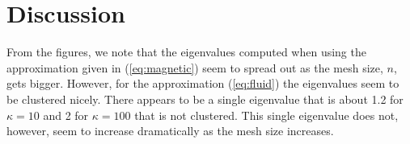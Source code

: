 \documentclass{article}
\begin{document}
\section{Discussion}

From the figures, we note that the eigenvalues computed when using the
approximation given in (\ref{eq:magnetic}) seem to spread out as the mesh size,
$n$, gets bigger. However, for the approximation (\ref{eq:fluid}) the eigenvalues seem to be
clustered nicely. There appears to be a single eigenvalue that is about 1.2 for
$\kappa = 10$ and 2 for $\kappa = 100$ that is not clustered. This single
eigenvalue does not, however, seem to increase dramatically as the mesh size
increases. 
\end{document}
